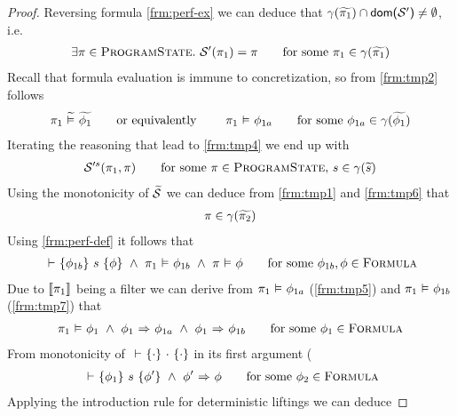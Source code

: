 \begin{proof}
    Reversing formula \ref{frm:perf-ex} we can deduce that $\gamma(\widetilde{\pi_1}) \cap \textup{\textmd{\textsf{dom($\mathcal{S}'$)}}} \neq \emptyset$, i.e.
    \begin{align}
    \label{frm:tmp4}
    \exists \pi \in \textup{\textsc{ProgramState}}.~ \mathcal{S}'(\pi_1) = \pi 
    \quad\quad\text{for some } \pi_1 \in \gamma(\widetilde{\pi_1})
    \end{align}
    Recall that formula evaluation is immune to concretization, so from \ref{frm:tmp2} follows
    \begin{align}
    \label{frm:tmp5}
    \pi_1 \,\,\widetilde{\vDash}\,\, \widetilde{\phi_1}
    \text{\quad\quad or equivalently \quad\quad}
    \pi_1 \,\,{\vDash}\,\, \phi_{1a}
    \quad\quad\text{for some } \phi_{1a} \in \gamma(\widetilde{\phi_1}) 
    \end{align}
    Iterating the reasoning that lead to \ref{frm:tmp4} we end up with
    \begin{align}
    \label{frm:tmp6}
    \mathcal{S}'^s(\pi_1, \pi)
    \quad\quad\text{for some } \pi \in \textup{\textsc{ProgramState}},\, s \in \gamma(\widetilde{s}) 
    \end{align}
    Using the monotonicity of $\widetilde{\mathcal{S}}$ we can deduce from \ref{frm:tmp1} and \ref{frm:tmp6} that
    \begin{align}
    \label{frm:tmp6x}
    \pi \in \gamma(\widetilde{\pi_2})
    \end{align}
    Using \ref{frm:perf-def} it follows that
    \begin{align}
    \label{frm:tmp7}
    {} \,\,{\vdash}\,\, \{{\phi_{1b}}\} ~{s}~ \{{\phi}\} ~\wedge~ \pi_1 \,\,{\vDash}\,\, \phi_{1b} ~\wedge~ \pi \,\,{\vDash}\,\, \phi
    \quad\quad\text{for some } \phi_{1b}, \phi \in \textup{\textsc{Formula}}
    \end{align}
    Due to $\llbracket {\pi_1} \rrbracket$ being a filter we can derive from $\pi_1 \,\,{\vDash}\,\, \phi_{1a}$ (\ref{frm:tmp5}) and $\pi_1 \,\,{\vDash}\,\, \phi_{1b}$ (\ref{frm:tmp7}) that
    \begin{align}
    \label{frm:tmp8}
    \pi_1 \,\,{\vDash}\,\, \phi_1 ~\wedge~ {\phi_1} \,\,{\Rightarrow}\,\, {\phi_{1a}} ~\wedge~ {\phi_1} \,\,{\Rightarrow}\,\, {\phi_{1b}}
    \quad\quad\text{for some } \phi_1 \in \textup{\textsc{Formula}}
    \end{align}
    From monotonicity of ${} \,\,{\vdash}\,\, \{{\cdot}\} ~{\cdot}~ \{{\cdot}\}$ in its first argument (%
    \begin{align}
    \label{frm:tmp9}
    {} \,\,{\vdash}\,\, \{{\phi_1}\} ~{s}~ \{{\phi'}\} ~\wedge~ {\phi'} \,\,{\Rightarrow}\,\, {\phi}
    \quad\quad\text{for some } \phi_2 \in \textup{\textsc{Formula}}
    \end{align}
    Applying the introduction rule for deterministic liftings we can deduce

\end{proof}
